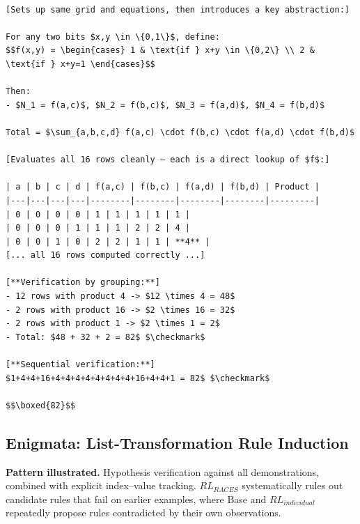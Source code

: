 \smallskip
\begin{tcolorbox}[
  enhanced, breakable, width=\linewidth,
  colback=green!3, colframe=green!75!black,
  title={\textbf{RACES}, functional abstraction with two-way verification},
  fonttitle=\sffamily, coltitle=black
]
\begin{Verbatim}[fontsize=\footnotesize, breaklines, breakanywhere]

[Sets up same grid and equations, then introduces a key abstraction:]

For any two bits $x,y \in \{0,1\}$, define:
$$f(x,y) = \begin{cases} 1 & \text{if } x+y \in \{0,2\} \\ 2 & \text{if } x+y=1 \end{cases}$$

Then:
- $N_1 = f(a,c)$, $N_2 = f(b,c)$, $N_3 = f(a,d)$, $N_4 = f(b,d)$

Total = $\sum_{a,b,c,d} f(a,c) \cdot f(b,c) \cdot f(a,d) \cdot f(b,d)$

[Evaluates all 16 rows cleanly — each is a direct lookup of $f$:]

| a | b | c | d | f(a,c) | f(b,c) | f(a,d) | f(b,d) | Product |
|---|---|---|---|--------|--------|--------|--------|---------|
| 0 | 0 | 0 | 0 | 1 | 1 | 1 | 1 | 1 |
| 0 | 0 | 0 | 1 | 1 | 1 | 2 | 2 | 4 |
| 0 | 0 | 1 | 0 | 2 | 2 | 1 | 1 | **4** |
[... all 16 rows computed correctly ...]

[**Verification by grouping:**]
- 12 rows with product 4 -> $12 \times 4 = 48$
- 2 rows with product 16 -> $2 \times 16 = 32$
- 2 rows with product 1 -> $2 \times 1 = 2$
- Total: $48 + 32 + 2 = 82$ $\checkmark$

[**Sequential verification:**]
$1+4+4+16+4+4+4+4+4+4+4+4+16+4+4+1 = 82$ $\checkmark$

$$\boxed{82}$$

\end{Verbatim}
\end{tcolorbox}

\subsection{Enigmata: List-Transformation Rule Induction}
\label{app:case-list-transform}

\textbf{Pattern illustrated.} Hypothesis verification against all
demonstrations, combined with explicit index--value tracking.
$RL_{RACES}$ systematically rules out candidate rules that fail on
earlier examples, where Base and $RL_{individual}$ repeatedly
propose rules contradicted by their own observations.


